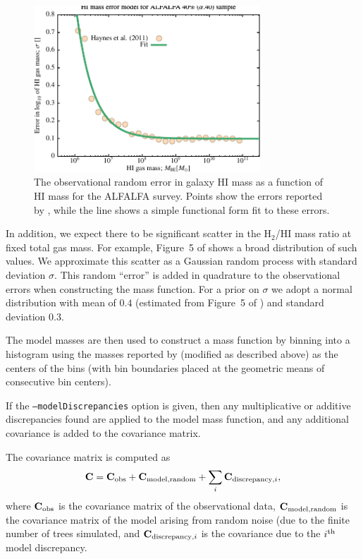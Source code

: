 \begin{figure}
 \begin{center}
 \includegraphics[width=85mm,trim=0mm 0mm 0mm 4mm,clip]{Plots/DataAnalysis/alfalfaHIMassErrorModel.pdf}
 \caption{The observational random error in galaxy HI mass as a function of HI mass for the ALFALFA survey. Points show the errors reported by \protect\cite{haynes_arecibo_2011}, while the line shows a simple functional form fit to these errors.}
 \end{center}
 \label{fig:ALFALFAErrorModel}
\end{figure}

In addition, we expect there to be significant scatter in the H$_2$/HI mass ratio at fixed total gas mass. For example, Figure~5 of \cite{power_redshift_2010} shows a broad distribution of such values. We approximate this scatter as a Gaussian random process with standard deviation $\sigma$. This random ``error'' is added in quadrature to the observational errors when constructing the mass function. For a prior on $\sigma$ we adopt a normal distribution with mean of $0.4$ (estimated from Figure~5 of \cite{power_redshift_2010}) and standard deviation $0.3$.

The model masses are then used to construct a mass function by binning into a histogram using the masses reported by \cite{martin_arecibo_2010} (modified as described above) as the centers of the bins (with bin boundaries placed at the geometric means of consecutive bin centers).

If the {\tt --modelDiscrepancies} option is given, then any multiplicative or additive discrepancies found are applied to the model mass function, and any additional covariance is added to the covariance matrix.

The covariance matrix is computed as
\begin{equation}
 {\bf C} = {\bf C}_{\rm obs} + {\bf C}_{\rm model,random} + \sum_i {\bf C}_{{\rm discrepancy}, i},
\end{equation}
where ${\bf C}_{\rm obs}$ is the covariance matrix of the observational data, ${\bf C}_{\rm model,random}$ is the covariance matrix of the model arising from random noise (due to the finite number of trees simulated, and ${\bf C}_{{\rm discrepancy}, i}$ is the covariance due to the $i^{\rm th}$ model discrepancy.

